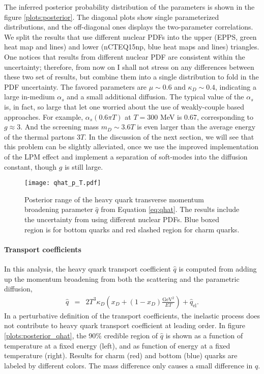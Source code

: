 The inferred posterior probability distribution of the parameters is shown in the figure \ref{plots:posterior}.
The diagonal plots show single parameterized distributions, and the off-diagonal ones displays the two-parameter correlations.
We split the results that use different nuclear PDFs into the upper (EPPS, green heat map and lines) and lower (nCTEQ15np, blue heat maps and lines) triangles.
One notices that results from different nuclear PDF are consistent within the uncertainty; therefore, from now on I shall not stress on any differences between these two set of results, but combine them into a single distribution to fold in the PDF uncertainty.
The favored parameters are $\mu \sim 0.6$ and $\kappa_D \sim 0.4$, indicating a large in-medium $\alpha_s$ and a small additional diffusion.
The typical value of the $\alpha_s$ is, in fact, so large that let one worried about the use of weakly-couple based approaches.
For example, $\alpha_s(0.6\pi T)$ at $T=300$ MeV is 0.67, corresponding to $g \approx 3$. 
And the screening mass $m_D \sim 3.6 T$ is even larger than the average energy of the thermal partons $3T$. 
In the discussion of the next section, we will see that this problem can be slightly alleviated, once we use the improved implementation of the LPM effect and implement a separation of soft-modes into the diffusion constant, though $g$ is still large.

\begin{figure}
\texttt{[image: qhat\_p\_T.pdf]}
\caption{Posterior range of the heavy quark transverse momentum broadening parameter $\hat{q}$ from Equation \ref{eq:qhat}. The results include the uncertainty from using different nuclear PDFs. Blue boxed region is for bottom quarks and red slashed region for charm quarks.}\label{fig:posterior_qhat}
\end{figure}

\paragraph{Transport coefficients} In this analysis, the heavy quark transport coefficient $\hat{q}$ is computed from adding up the momentum broadening from both the scattering and the parametric diffusion,
\begin{eqnarray}\label{eq:qhat}
\hat{q} &=& 2T^3\kappa_D\left(x_D + (1-x_D)\frac{\textrm{GeV}^2}{ET}\right) + \hat{q}_{\textrm{el}}.
\end{eqnarray}
In a perturbative definition of the transport coefficients, the inelastic process does not contribute to heavy quark transport coefficient at leading order. 
In figure \ref{plots:posterior_qhat}, the 90\% credible region of $\hat{q}$ is shown as a function of temperature at a fixed energy (left), and as function of energy at a fixed temperature (right).
Results for charm (red) and bottom (blue) quarks are labeled by different colors.
The mass difference only causes a small difference in $\hat{q}$.

